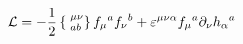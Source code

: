 \begin{equation}
{\cal L} = - \frac{1}{2} \left\{ \phantom{|}^{\mu\nu}_{ab} \right\}
f_\mu{}^a f_\nu{}^b + \varepsilon^{\mu\nu\alpha} f_\mu{}^a
\partial_\nu h_\alpha{}^a
\end{equation}

